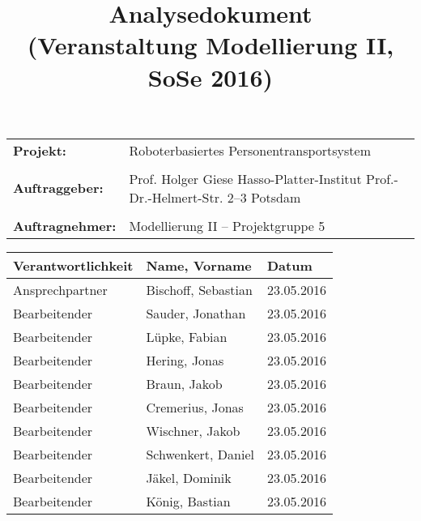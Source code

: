 \documentclass[includeheaders]{scrartcl}
\begin{document}
	
	
	
	\newpage
	
	\title{Analysedokument\\ \small{(Veranstaltung Modellierung II, SoSe 2016)}}
	\date{}
	\author{}
	
	\maketitle
	\begin{table}[H]
		\centering
		\begin{tabular}{lp{7.5cm}}
			\textbf{Projekt:} & Roboterbasiertes Personentransportsystem\\
			&\\
			\textbf{Auftraggeber: }& Prof. Holger Giese \newline Hasso-Platter-Institut \newline Prof.-Dr.-Helmert-Str. 2–3 \newline 14482 Potsdam\\
			&\\
			\textbf{Auftragnehmer: }& Modellierung II – Projektgruppe 5 \\
		\end{tabular}
	\end{table}
	
	
	
	\newpage
	
	\begin{table}[H]
		\centering
		\begin{tabularx}{\textwidth}{|p{4cm}|X|p{4cm}|}
			\hline
			Verantwortlichkeit & Name, Vorname & Datum \\ \hline
			Ansprechpartner    & Bischoff, Sebastian & 23.05.2016 \\
			Bearbeitender      & Sauder, Jonathan & 23.05.2016 \\ 
			Bearbeitender      & Lüpke, Fabian & 23.05.2016 \\ 
			Bearbeitender      & Hering, Jonas & 23.05.2016 \\
			Bearbeitender      & Braun, Jakob & 23.05.2016  \\
			Bearbeitender      & Cremerius, Jonas & 23.05.2016 \\
			Bearbeitender      & Wischner, Jakob & 23.05.2016 \\
			Bearbeitender      & Schwenkert, Daniel & 23.05.2016 \\
			Bearbeitender      & Jäkel, Dominik & 23.05.2016 \\
			Bearbeitender      & König, Bastian & 23.05.2016 \\ \hline
		\end{tabularx}
	\end{table}
	
	\newpage
	
	\tableofcontents

\newpage

\newpage

\newpage

\newpage

\newpage

\newpage

\newpage

\newpage

\newpage

\end{document}
